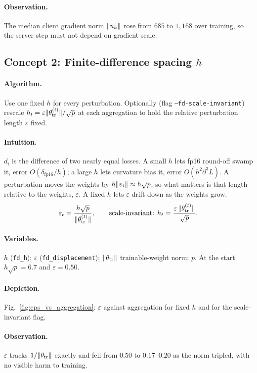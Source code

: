 \paragraph{Observation.}
The median client gradient norm $\lVert u_k\rVert$ rose from $685$ to $1{,}168$ over training, so the server step must not depend on gradient scale.

\subsection{Concept 2: Finite-difference spacing $h$}
\paragraph{Algorithm.}
Use one fixed $h$ for every perturbation. Optionally (flag \texttt{--fd-scale-invariant}) rescale $h_t=\varepsilon\lVert \theta_{\mathrm{tr}}^{(t)}\rVert/\sqrt p$ at each aggregation to hold the relative perturbation length $\varepsilon$ fixed.
\paragraph{Intuition.}
$d_i$ is the difference of two nearly equal losses. A small $h$ lets fp16 round-off swamp it, error $O(\delta_{\mathrm{fp16}}/h)$;
a large $h$ lets curvature bias it, error $O(h^2\partial^3L)$. A perturbation moves the weights by $h\lVert v_i\rVert\approx h\sqrt p$,
so what matters is that length relative to the weights, $\varepsilon$. A fixed $h$ lets $\varepsilon$ drift down as the weights grow.
\begin{equation}
\varepsilon_t=\frac{h\sqrt p}{\lVert \theta_{\mathrm{tr}}^{(t)}\rVert},\qquad
\text{scale-invariant: }h_t=\frac{\varepsilon\,\lVert \theta_{\mathrm{tr}}^{(t)}\rVert}{\sqrt p}.
\end{equation}
\paragraph{Variables.}
$h$ (\texttt{fd\_h}); $\varepsilon$ (\texttt{fd\_displacement}); $\lVert \theta_{\mathrm{tr}}\rVert$ trainable-weight norm; $p$.
At the start $h\sqrt p=6.7$ and $\varepsilon=0.50$.
\paragraph{Depiction.} Fig.~\ref{fig:eps_vs_aggregation}: $\varepsilon$ against aggregation for fixed $h$ and for the scale-invariant flag.
\paragraph{Observation.}
$\varepsilon$ tracks $1/\lVert \theta_{\mathrm{tr}}\rVert$ exactly and fell from $0.50$ to $0.17$--$0.20$ as the norm tripled, with no visible harm to training.


